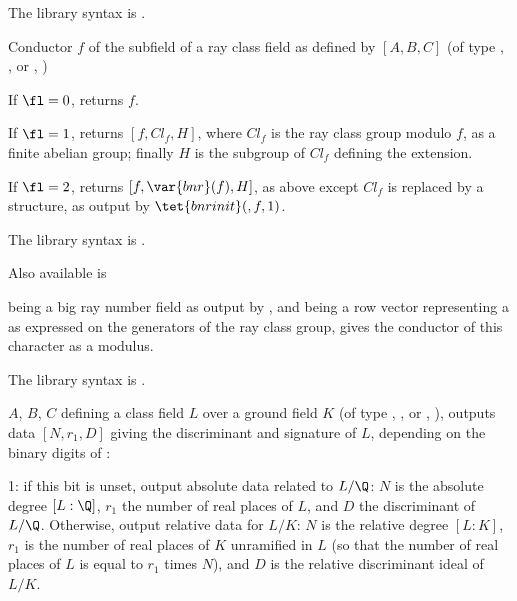 The library syntax is .

\label{se:bnrconductor}
Conductor $f$ of the subfield of a ray class field as defined by $[A,B,C]$
(of type ,
,
 or
,
)

If $\fl = 0$, returns $f$.

If $\fl = 1$, returns $[f, Cl_f, H]$, where $Cl_f$ is the ray class group
modulo $f$, as a finite abelian group; finally $H$ is the subgroup of $Cl_f$
defining the extension.

If $\fl = 2$, returns $[f, \var{bnr}(f), H]$, as above except $Cl_f$ is
replaced by a  structure, as output by $\tet{bnrinit}(,f,1)$.

The library syntax is .

Also available is 

\label{se:bnrconductorofchar}
 being a big
ray number field as output by , and  being a row vector
representing a  as expressed on the generators of the ray
class group, gives the conductor of this character as a modulus.

The library syntax is .

\label{se:bnrdisc}
$A$, $B$, $C$ defining a class field $L$ over a ground field $K$
(of type ,
,
 or
,
), outputs data $[N,r_1,D]$ giving the discriminant and
signature of $L$, depending on the binary digits of \fl:

\item 1: if this bit is unset, output absolute data related to $L/\Q$:
$N$ is the absolute degree $[L:\Q]$, $r_1$ the number of real places of $L$,
and $D$ the discriminant of $L/\Q$. Otherwise, output relative data for $L/K$:
$N$ is the relative degree $[L:K]$, $r_1$ is the number of real places of $K$
unramified in $L$ (so that the number of real places of $L$ is equal to $r_1$
times $N$), and $D$ is the relative discriminant ideal of $L/K$.

